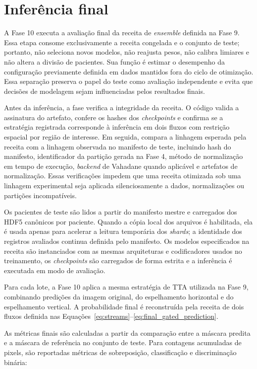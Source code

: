 \section{Inferência final}\label{sec:met_inferencia_final}

A Fase 10 executa a avaliação final da receita de \textit{ensemble} definida na
Fase 9. Essa etapa consome exclusivamente a receita congelada e o conjunto de
teste; portanto, não seleciona novos modelos, não reajusta pesos, não calibra
limiares e não altera a divisão de pacientes. Sua função é estimar o desempenho
da configuração previamente definida em dados mantidos fora do ciclo de
otimização. Essa separação preserva o papel do teste como avaliação independente
e evita que decisões de modelagem sejam influenciadas pelos resultados finais.

Antes da inferência, a fase verifica a integridade da receita. O código valida a
assinatura do artefato, confere os hashes dos \textit{checkpoints} e confirma se
a estratégia registrada corresponde à inferência em dois fluxos com restrição
espacial por região de interesse. Em seguida, compara a
linhagem esperada pela receita com a linhagem observada no manifesto de teste,
incluindo hash do manifesto, identificador da partição gerada na Fase 4, método
de normalização em tempo de execução, \textit{backend} de Vahadane quando
aplicável e artefatos de normalização. Essas verificações impedem que uma
receita otimizada sob uma linhagem experimental seja aplicada silenciosamente a
dados, normalizações ou partições incompatíveis.

Os pacientes de teste são lidos a partir do manifesto mestre e
carregados dos HDF5 canônicos por paciente. Quando a cópia local dos arquivos é
habilitada, ela é usada apenas para acelerar a leitura temporária dos
\textit{shards}; a identidade dos registros avaliados continua definida pelo
manifesto. Os modelos especificados na receita são instanciados com as mesmas
arquiteturas e codificadores usados no treinamento, os \textit{checkpoints} são
carregados de forma estrita e a inferência é executada em modo de avaliação.

Para cada lote, a Fase 10 aplica a mesma estratégia de TTA utilizada na
Fase 9, combinando predições da imagem original, do espelhamento horizontal e do
espelhamento vertical. A probabilidade final é reconstruída pela receita de
dois fluxos definida nas Equações~\ref{eq:streams}--\ref{eq:final_gated_prediction}.

As métricas finais são calculadas a partir da comparação entre a máscara predita
e a máscara de referência no conjunto de teste. Para contagens acumuladas de
pixels, são reportadas métricas de sobreposição, classificação e discriminação
binária:

